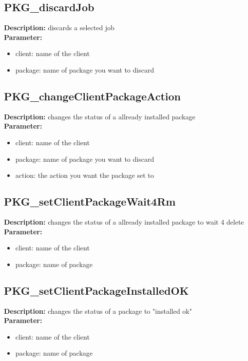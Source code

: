 \subsection{PKG\_discardJob}
\textbf{Description:} discards a selected job\\
\textbf{Parameter:}
\begin{itemize}
\item client: name of the client
\item package: name of package you want to discard
\end{itemize}

\subsection{PKG\_changeClientPackageAction}
\textbf{Description:} changes the status of a allready installed package\\
\textbf{Parameter:}
\begin{itemize}
\item client: name of the client
\item package: name of package you want to discard
\item action: the action you want the package set to
\end{itemize}

\subsection{PKG\_setClientPackageWait4Rm}
\textbf{Description:} changes the status of a allready installed package to wait 4 delete\\
\textbf{Parameter:}
\begin{itemize}
\item client: name of the client
\item package: name of package
\end{itemize}

\subsection{PKG\_setClientPackageInstalledOK}
\textbf{Description:} changes the status of a package to "installed ok"\\
\textbf{Parameter:}
\begin{itemize}
\item client: name of the client
\item package: name of package
\end{itemize}

